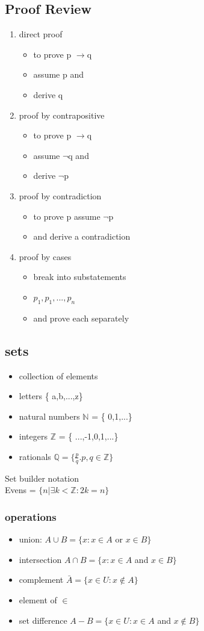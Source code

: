 \documentclass[a4paper]{article}
\newcommand{\ra}{$\rightarrow$}
\newcommand{\n}{$\neg$}
\newcommand{\bi}{\begin{itemize}}
\newcommand{\ei}{\end{itemize}}
\newcommand{\be}{\begin{enumerate}}
\newcommand{\ee}{\end{enumerate}}
\begin{document}
\begin{itemize}
    \subsection{Proof Review}
      \be
        \item direct proof
          \bi
            \item to prove p \ra q
            \item assume p and
            \item derive q
          \ei
        \item proof by contrapositive
          \bi
            \item to prove p \ra q
            \item assume \n q and 
            \item derive \n p
          \ei
        \item proof by contradiction
          \bi
            \item to prove p assume \n p 
            \item and derive a contradiction
          \ei
        \item proof by cases
          \bi
            \item break into substatements
            \item $p_1,p_1,...,p_n$
            \item and prove each separately
          \ei
      \ee
    \subsection{sets}
      \bi
        \item collection of elements
        \item letters \{ a,b,...,z\}
        \item natural numbers $\mathbb{N}$ = \{ 0,1,...\}
        \item integers $\mathbb{Z}$ = \{ ...,-1,0,1,...\}
        \item rationals $\mathbb{Q} = \{ \frac{p}{q}. p,q \in \mathbb{Z}\}$
      \ei
      Set builder notation\\
      Evens = $\{ n|\exists k<\mathbb{Z} : 2k=n\}$
      \subsubsection{operations}
        \bi
          \item union: $A\cup B = \{ x:x\in A$ or $x\in B\}$
          \item intersection $A\cap B = \{ x:x\in A$ and $x\in B\}$
          \item complement $\bar{A} = \{x\in U:x\notin A\}$
          \item element of $\in$
          \item set difference $A-B = \{x\in U:x\in A$ and $x\notin B\}$
        \ei

\end{itemize}
\end{document}
